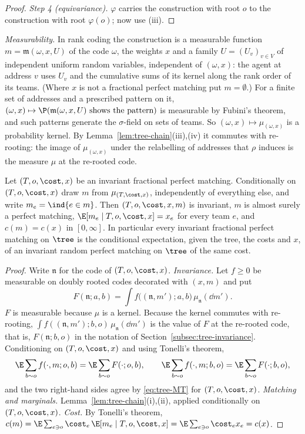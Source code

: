 \begin{proof}
\emph{Step 4 (equivariance).} $\varphi$ carries the construction with root $o$ to the
construction with root $\varphi(o)$; now use (iii).
\end{proof}

\emph{Measurability.} In rank coding the construction is a measurable function
$m=\mathfrak{m}(\omega,x,U)$ of the code $\omega$, the weights $x$ and a family
$U=(U_v)_{v\in V}$ of independent uniform random variables, independent of $(\omega,x)$: the
agent at address $v$ uses $U_v$ and the cumulative sums of its kernel along the rank order of
its teams. (Where $x$ is not a fractional perfect matching put $m=\emptyset$.) For a finite set
of addresses and a prescribed pattern on it,
$(\omega,x)\mapsto\P(\mathfrak{m}(\omega,x,U)\text{ shows the pattern})$ is measurable by
Fubini's theorem, and such patterns generate the $\sigma$-field on sets of teams. So
$(\omega,x)\mapsto\mu_{(\omega,x)}$ is a probability kernel. By
Lemma~\ref{lem:tree-chain}(iii),(iv) it commutes with re-rooting: the image of
$\mu_{(\omega,x)}$ under the relabelling of addresses that $\rho$ induces is the measure $\mu$
at the re-rooted code.

\begin{theorem}[decomposition]\label{thm:decomp}
Let $(T,o,\cost,x)$ be an invariant fractional perfect matching. Conditionally on
$(T,o,\cost,x)$ draw $m$ from $\mu_{(T,\cost,x)}$, independently of everything else, and write
$m_e=\ind\{e\in m\}$. Then $(T,o,\cost,x,m)$ is invariant, $m$ is almost surely a perfect
matching, $\E[m_e\mid T,o,\cost,x]=x_e$ for every team $e$, and $c(m)=c(x)$ in $[0,\infty]$.
In particular every invariant fractional perfect matching on $\tree$ is the conditional
expectation, given the tree, the costs and $x$, of an invariant random perfect matching on
$\tree$ of the same cost.
\end{theorem}

\begin{proof}
Write $\mathfrak{n}$ for the code of $(T,o,\cost,x)$. \emph{Invariance.} Let $f\ge0$ be
measurable on doubly rooted codes decorated with $(x,m)$ and put
\[
  F(\mathfrak{n};a,b)=\int f\bigl((\mathfrak{n},m');a,b\bigr)\,\mu_{\mathfrak{n}}(\dd m').
\]
$F$ is measurable because $\mu$ is a kernel. Because the kernel commutes with re-rooting,
$\int f((\mathfrak{n},m');b,o)\,\mu_{\mathfrak{n}}(\dd m')$ is the value of $F$ at the
re-rooted code, that is, $F(\mathfrak{n};b,o)$ in the notation of
Section~\ref{subsec:tree-invariance}. Conditioning on $(T,o,\cost,x)$ and using Tonelli's
theorem,
\[
  \E\sum_{b\sim o}f(\cdot,m;o,b)=\E\sum_{b\sim o}F(\cdot;o,b),\qquad
  \E\sum_{b\sim o}f(\cdot,m;b,o)=\E\sum_{b\sim o}F(\cdot;b,o),
\]
and the two right-hand sides agree by \eqref{eq:tree-MT} for $(T,o,\cost,x)$.
\emph{Matching and marginals.} Lemma~\ref{lem:tree-chain}(i),(ii), applied conditionally on
$(T,o,\cost,x)$. \emph{Cost.} By Tonelli's theorem,
$c(m)=\E\sum_{e\ni o}\cost_e\,\E[m_e\mid T,o,\cost,x]=\E\sum_{e\ni o}\cost_e x_e=c(x)$.
\end{proof}

